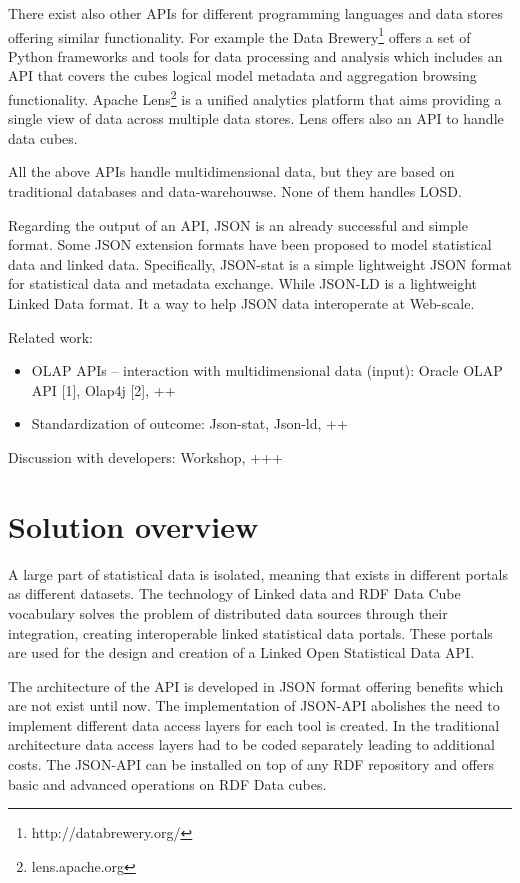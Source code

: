 \documentclass{llncs}
\begin{document}
There exist also other APIs for different programming languages and data stores offering similar functionality. For example the Data Brewery\footnote{http://databrewery.org/} offers a set of Python frameworks and tools for data processing and analysis which includes an API that covers the cubes logical model metadata and aggregation browsing functionality. Apache Lens\footnote{lens.apache.org} is a unified analytics platform that aims providing a single view of data across multiple data stores. Lens offers also an API to handle data cubes.

All the above APIs handle multidimensional data, but they are based on traditional databases and data-warehouwse. None of them handles LOSD. 

Regarding the output of an API, JSON is an already successful and simple format. Some JSON extension formats have been proposed to model statistical data and linked data. Specifically, JSON-stat is a simple lightweight JSON  format for statistical data and metadata exchange. While 
JSON-LD is a lightweight Linked Data format. It a way to help JSON data interoperate at Web-scale. 

Related work:
\begin{itemize}
\item  OLAP APIs – interaction with multidimensional data (input): Oracle OLAP API [1], Olap4j [2], ++
\item Standardization of outcome: Json-stat, Json-ld, ++
\end{itemize}

Discussion with developers: Workshop, +++

\section{Solution overview}\label{sec:overview}

A large part of statistical data is isolated, meaning that exists in different portals as different datasets. The technology of Linked data and RDF Data Cube vocabulary solves the problem of distributed data sources through their integration, creating interoperable linked statistical data portals. These portals are used for the design and creation of a Linked Open Statistical Data API. 

The architecture of the API is developed in JSON format offering benefits which are not exist until now. The implementation of JSON-API abolishes the need to implement different data access layers for each tool is created. In the traditional architecture data access layers had to be coded separately leading to additional costs. The JSON-API can be installed on top of any RDF repository and offers basic and advanced operations on RDF Data cubes. 
\end{document}
